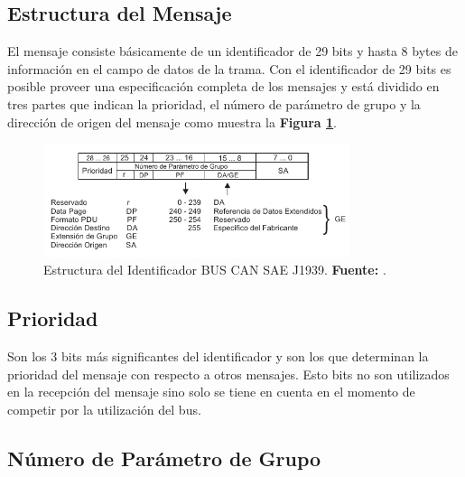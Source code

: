 \subsection{Estructura del Mensaje}
El mensaje consiste básicamente de un identificador de 29 bits y hasta 8 bytes de información en el campo de datos de la trama. Con el identificador de 29 bits es posible proveer una especificación completa de los mensajes y está dividido en tres partes que indican la prioridad, el número de parámetro de grupo y la dirección de origen del mensaje como muestra la \textbf{Figura \ref{bitj}}.


\begin{figure}[H]
	\centering
		\includegraphics[width=0.8\textwidth]{./Cap3imagen/bit29.pdf}
	\caption[Estructura del Identificador BUS CAN SAE J1939.]{Estructura del Identificador BUS CAN SAE J1939.\textbf{ Fuente:} \cite{EPCAN}.}
	\label{bitj} %
\end{figure}


\subsection{Prioridad}
Son los 3 bits más significantes del identificador y son los que determinan la prioridad del mensaje con respecto a otros mensajes. Esto bits no son utilizados en la recepción del mensaje sino solo se tiene en cuenta en el momento de competir por la utilización del bus.

\subsection{Número de Parámetro de Grupo}

